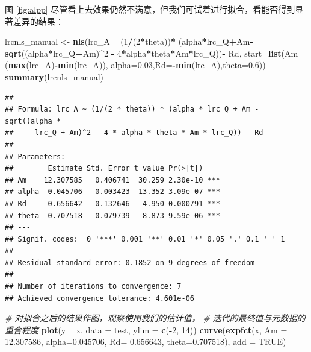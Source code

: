 \documentclass[
]{krantz}
\makeatletter
\newenvironment{Shaded}{\begin{snugshade}}{\end{snugshade}}
\newcommand{\CommentTok}[1]{\textcolor[rgb]{0.56,0.35,0.01}{\textit{#1}}}
\newcommand{\DataTypeTok}[1]{\textcolor[rgb]{0.13,0.29,0.53}{#1}}
\newcommand{\DecValTok}[1]{\textcolor[rgb]{0.00,0.00,0.81}{#1}}
\newcommand{\FloatTok}[1]{\textcolor[rgb]{0.00,0.00,0.81}{#1}}
\newcommand{\KeywordTok}[1]{\textcolor[rgb]{0.13,0.29,0.53}{\textbf{#1}}}
\newcommand{\NormalTok}[1]{#1}
\newcommand{\OperatorTok}[1]{\textcolor[rgb]{0.81,0.36,0.00}{\textbf{#1}}}
\newcommand{\OtherTok}[1]{\textcolor[rgb]{0.56,0.35,0.01}{#1}}
\newcommand{\StringTok}[1]{\textcolor[rgb]{0.31,0.60,0.02}{#1}}
\newenvironment{kframe}{%
\medskip{}
\setlength{\fboxsep}{.8em}
 \def\at@end@of@kframe{}%
 \ifinner\ifhmode%
  \def\at@end@of@kframe{\end{minipage}}%
  \begin{minipage}{\columnwidth}%
 \fi\fi%
 \def\FrameCommand##1{\hskip\@totalleftmargin \hskip-\fboxsep
 \colorbox{shadecolor}{##1}\hskip-\fboxsep
     \hskip-\linewidth \hskip-\@totalleftmargin \hskip\columnwidth}%
 \MakeFramed {\advance\hsize-\width
   \@totalleftmargin\z@ \linewidth\hsize
   \@setminipage}}%
 {\par\unskip\endMakeFramed%
 \at@end@of@kframe}
\renewenvironment{Shaded}{\begin{kframe}}{\end{kframe}}
\makeatother
\begin{document}
图 \ref{fig:alpp} 尽管看上去效果仍然不满意，但我们可试着进行拟合，看能否得到显著差异的结果：

\begin{Shaded}
\begin{Highlighting}[]
\NormalTok{lrcnls_manual <-}\StringTok{ }\KeywordTok{nls}\NormalTok{(lrc_A }\OperatorTok{~}\StringTok{ }
\StringTok{        }\NormalTok{(}\DecValTok{1}\OperatorTok{/}\NormalTok{(}\DecValTok{2}\OperatorTok{*}\NormalTok{theta))}\OperatorTok{*}
\StringTok{        }\NormalTok{(alpha}\OperatorTok{*}\NormalTok{lrc_Q}\OperatorTok{+}\NormalTok{Am}\OperatorTok{-}\KeywordTok{sqrt}\NormalTok{((alpha}\OperatorTok{*}\NormalTok{lrc_Q}\OperatorTok{+}\NormalTok{Am)}\OperatorTok{^}\DecValTok{2} \OperatorTok{-}\StringTok{ }
\StringTok{                               }\DecValTok{4}\OperatorTok{*}\NormalTok{alpha}\OperatorTok{*}\NormalTok{theta}\OperatorTok{*}\NormalTok{Am}\OperatorTok{*}\NormalTok{lrc_Q))}\OperatorTok{-}\StringTok{ }
\StringTok{        }\NormalTok{Rd, }\DataTypeTok{start=}\KeywordTok{list}\NormalTok{(}\DataTypeTok{Am=}\NormalTok{(}\KeywordTok{max}\NormalTok{(lrc_A)}\OperatorTok{-}\KeywordTok{min}\NormalTok{(lrc_A)),}
                       \DataTypeTok{alpha=}\FloatTok{0.03}\NormalTok{,}\DataTypeTok{Rd=}\OperatorTok{-}\KeywordTok{min}\NormalTok{(lrc_A),}\DataTypeTok{theta=}\FloatTok{0.6}\NormalTok{))}
\KeywordTok{summary}\NormalTok{(lrcnls_manual)}
\end{Highlighting}
\end{Shaded}

\begin{verbatim}
## 
## Formula: lrc_A ~ (1/(2 * theta)) * (alpha * lrc_Q + Am - sqrt((alpha * 
##     lrc_Q + Am)^2 - 4 * alpha * theta * Am * lrc_Q)) - Rd
## 
## Parameters:
##        Estimate Std. Error t value Pr(>|t|)    
## Am    12.307585   0.406741  30.259 2.30e-10 ***
## alpha  0.045706   0.003423  13.352 3.09e-07 ***
## Rd     0.656642   0.132646   4.950 0.000791 ***
## theta  0.707518   0.079739   8.873 9.59e-06 ***
## ---
## Signif. codes:  0 '***' 0.001 '**' 0.01 '*' 0.05 '.' 0.1 ' ' 1
## 
## Residual standard error: 0.1852 on 9 degrees of freedom
## 
## Number of iterations to convergence: 7 
## Achieved convergence tolerance: 4.601e-06
\end{verbatim}

\begin{Shaded}
\begin{Highlighting}[]
\CommentTok{# 对拟合之后的结果作图，观察使用我们的估计值，}
\CommentTok{# 迭代的最终值与元数据的重合程度}
\KeywordTok{plot}\NormalTok{(y }\OperatorTok{~}\StringTok{ }\NormalTok{x, }\DataTypeTok{data =}\NormalTok{ test, }\DataTypeTok{ylim =} \KeywordTok{c}\NormalTok{(}\OperatorTok{-}\DecValTok{2}\NormalTok{, }\DecValTok{14}\NormalTok{))}
\KeywordTok{curve}\NormalTok{(}\KeywordTok{expfct}\NormalTok{(x, }\DataTypeTok{Am =} \FloatTok{12.307586}\NormalTok{,}
     \DataTypeTok{alpha=}\FloatTok{0.045706}\NormalTok{, }\DataTypeTok{Rd=} \FloatTok{0.656643}\NormalTok{, }\DataTypeTok{theta=}\FloatTok{0.707518}\NormalTok{), }\DataTypeTok{add =} \OtherTok{TRUE}\NormalTok{)}
\end{Highlighting}
\end{Shaded}
\end{document}
